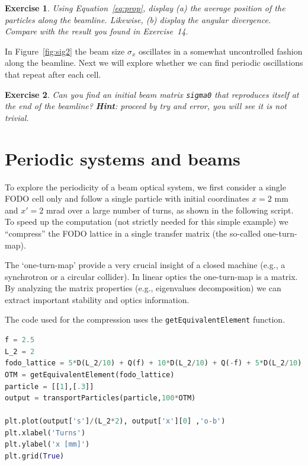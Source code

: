 \documentclass{article}
\newtheorem{exercise}{Exercise}
\newenvironment{block}[1]{\tcolorbox[beamer,%
    noparskip,breakable,
    colback=backcolour,colframe=blue,%
    colbacklower=backcolour!75!backcolour,%
    title=#1]
    }%
    {\endtcolorbox}
\begin{document}
\begin{exercise}
Using Equation~\ref{eq:prop}, display (a) the average position of the particles along the beamline. Likewise, (b) display the angular divergence. Compare with the result you found in Exercise~14.
\end{exercise}

In Figure~\ref{fig:sig2} the beam size $\sigma_x$ oscillates in a somewhat uncontrolled 
fashion along the beamline. Next we will explore whether we can find periodic oscillations
that repeat after each cell. 

\begin{exercise}
Can you find an initial beam matrix {\tt sigma0} that reproduces itself at the end of the beamline? \textbf{Hint}: proceed by try and error, you will see it is not trivial.
\end{exercise}


%
\section{Periodic systems and beams}
%
To explore the periodicity of a beam optical system, we first consider a single FODO
cell only and follow a single particle with initial coordinates $x=2$ mm and $x'=2$ mrad over 
a large number of turns, as shown in the following script. To speed up the computation (not strictly needed for this simple example) we ``compress'' the FODO lattice in a single transfer matrix (the so-called one-turn-map).
\begin{block}{Nota Bene}
The `one-turn-map' provide a very crucial insight of a closed machine (e.g., a synchrotron or a circular collider). In linear optics the one-turn-map is a matrix. By analyzing the matrix properties (e.g., eigenvalues decomposition) we can extract important stability and optics information.
\end{block}


The code used for the compression uses the {\tt getEquivalentElement} function. 
\begin{lstlisting}[language=Python]
f = 2.5
L_2 = 2
fodo_lattice = 5*D(L_2/10) + Q(f) + 10*D(L_2/10) + Q(-f) + 5*D(L_2/10)
OTM = getEquivalentElement(fodo_lattice)
particle = [[1],[.3]]
output = transportParticles(particle,100*OTM)

plt.plot(output['s']/(L_2*2), output['x'][0] ,'o-b')
plt.xlabel('Turns')
plt.ylabel('x [mm]')
plt.grid(True)
\end{lstlisting}
\end{document}
